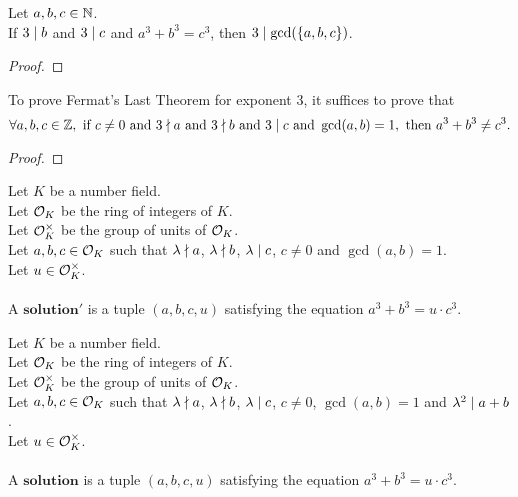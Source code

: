 \begin{lemma}
    \label{lmm:three_dvd_gcd_of_dvd_b_of_dvd_c}
    \leanok
    Let $a, b, c \in \mathbb{N}$. \\
    If $3 \mid b$ and $3 \mid c$ and $a ^ 3 + b ^ 3 = c ^ 3$, then $3 \mid \gcd(\left\{a, b, c\right\})$.
\end{lemma}
\begin{proof}
    \leanok
\end{proof}

\begin{theorem}
    \label{thm:fermatLastTheoremThree_of_three_dvd_only_c}
    \leanok
    To prove Fermat's Last Theorem for exponent $3$, it suffices to prove that
    $$\forall a, b, c \in \mathbb{Z}, \text{ if } c \neq 0 \text{ and } 3 \nmid a \text{ and }
    3 \nmid b \text{ and } 3 \mid c \text{ and } \gcd(a,b)=1,
    \text{ then } a^3 + b^3 \neq c^3.$$
\end{theorem}
\begin{proof}
    \leanok
\end{proof}

\begin{definition}[Solution']
    \label{def:Solution1}
    \leanok
    Let $K$ be a number field. \\
    Let $\mathcal{O}_K$ be the ring of integers of $K$. \\
    Let $\mathcal{O}^\times_K$ be the group of units of $\mathcal{O}_K$. \\
    Let $a, b, c \in \mathcal{O}_K$ such that $\lambda \nmid a$,
    $\lambda \nmid b$, $\lambda \mid c$, $c \neq 0$ and $\gcd(a,b)=1$.\\
    Let $u \in \mathcal{O}^\times_K$. \\\\
    A $\boldsymbol{solution'}$ is a tuple $(a, b, c, u)$
    satisfying the equation $a^3 + b^3 = u \cdot c^3.$
\end{definition}

\begin{definition}[Solution]
    \label{def:Solution}
    \leanok
    Let $K$ be a number field. \\
    Let $\mathcal{O}_K$ be the ring of integers of $K$. \\
    Let $\mathcal{O}^\times_K$ be the group of units of $\mathcal{O}_K$. \\
    Let $a, b, c \in \mathcal{O}_K$ such that $\lambda \nmid a$,
    $\lambda \nmid b$, $\lambda \mid c$, $c \neq 0$, $\gcd(a,b)=1$
    and $\lambda^2 \mid a+b$. \\
    Let $u \in \mathcal{O}^\times_K$. \\\\
    A $\boldsymbol{solution}$ is a tuple $(a, b, c, u)$
    satisfying the equation $a^3 + b^3 = u \cdot c^3.$
\end{definition}

